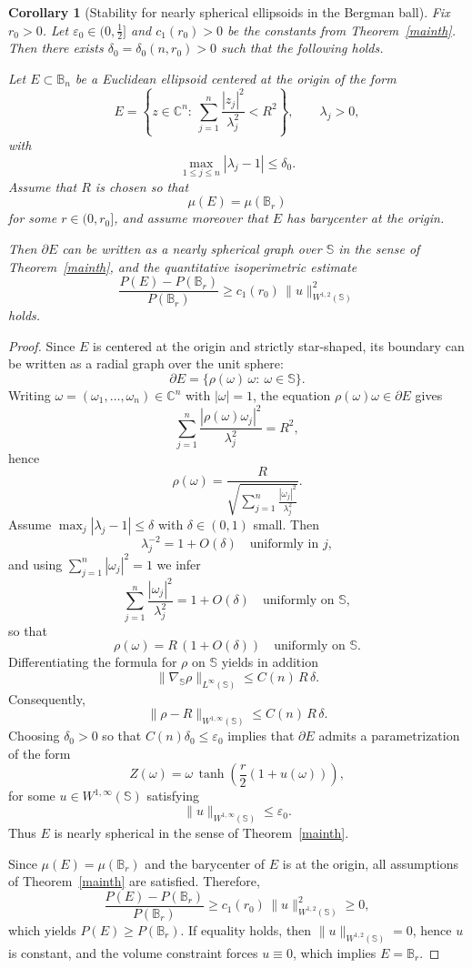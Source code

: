\documentclass[11pt]{amsart}
\newtheorem{corollary}[theorem]{Corollary}
\numberwithin{equation}{section}
\def\ge{\geqslant}
\begin{document}
\begin{corollary}[Stability for nearly spherical ellipsoids in the Bergman ball]\label{thm:ellipsoid_stability}
Fix $r_0>0$. Let $\varepsilon_0\in\bigl(0,\frac12\bigr]$ and $c_1(r_0)>0$ be the constants
from Theorem~\ref{mainth}. Then there exists $\delta_0=\delta_0(n,r_0)>0$ such that the
following holds.

Let $E\subset\mathbb B_n$ be a Euclidean ellipsoid centered at the origin of the form
\[
E=\left\{z\in\mathbb C^n:\ \sum_{j=1}^n \frac{|z_j|^2}{\lambda_j^2}<R^2\right\},
\qquad \lambda_j>0,
\]
with
\[
\max_{1\le j\le n}|\lambda_j-1|\le \delta_0.
\]
Assume that $R$ is chosen so that
\[
\mu(E)=\mu(\mathbb B_r)
\]
for some $r\in(0,r_0]$, and assume moreover that $E$ has barycenter at the origin.

Then $\partial E$ can be written as a nearly spherical graph over $\mathbb S$ in the sense
of Theorem~\ref{mainth}, and the quantitative isoperimetric estimate
\[
\frac{P(E)-P(\mathbb B_r)}{P(\mathbb B_r)}\ge c_1(r_0)\,\|u\|_{W^{1,2}(\mathbb S)}^2
\]
holds. 
\end{corollary}

\begin{proof}
Since $E$ is centered at the origin and strictly star-shaped, its boundary can be written
as a radial graph over the unit sphere:
\[
\partial E=\{\rho(\omega)\,\omega:\ \omega\in\mathbb S\}.
\]
Writing $\omega=(\omega_1,\dots,\omega_n)\in\mathbb C^n$ with $|\omega|=1$, the equation
$\rho(\omega)\omega\in\partial E$ gives
\[
\sum_{j=1}^n \frac{|\rho(\omega)\omega_j|^2}{\lambda_j^2}=R^2,
\]
hence
\[
\rho(\omega)=\frac{R}{\sqrt{\sum_{j=1}^n \frac{|\omega_j|^2}{\lambda_j^2}}}.
\]
Assume $\max_j|\lambda_j-1|\le \delta$ with $\delta\in(0,1)$ small. Then
\[
\lambda_j^{-2}=1+O(\delta)
\quad\text{uniformly in }j,
\]
and using $\sum_{j=1}^n|\omega_j|^2=1$ we infer
\[
\sum_{j=1}^n\frac{|\omega_j|^2}{\lambda_j^2}=1+O(\delta)
\quad\text{uniformly on }\mathbb S,
\]
so that
\[
\rho(\omega)=R\,(1+O(\delta))
\quad\text{uniformly on }\mathbb S.
\]
Differentiating the formula for $\rho$ on $\mathbb S$ yields in addition
\[
\|\nabla_{\mathbb S}\rho\|_{L^\infty(\mathbb S)}\le C(n)\,R\,\delta.
\]
Consequently,
\[
\|\rho-R\|_{W^{1,\infty}(\mathbb S)}\le C(n)\,R\,\delta.
\]
Choosing $\delta_0>0$ so that $C(n)\delta_0\le \varepsilon_0$ implies that $\partial E$
admits a parametrization of the form
\[
Z(\omega)=\omega\,\tanh\!\left(\frac r2(1+u(\omega))\right),
\]
for some $u\in W^{1,\infty}(\mathbb S)$ satisfying
\[
\|u\|_{W^{1,\infty}(\mathbb S)}\le \varepsilon_0.
\]
Thus $E$ is nearly spherical in the sense of Theorem~\ref{mainth}.

\medskip

Since $\mu(E)=\mu(\mathbb B_r)$ and the barycenter of $E$ is at the origin, all
assumptions of Theorem~\ref{mainth} are satisfied. Therefore,
\[
\frac{P(E)-P(\mathbb B_r)}{P(\mathbb B_r)}\ge c_1(r_0)\,\|u\|_{W^{1,2}(\mathbb S)}^2\ge 0,
\]
which yields $P(E)\ge P(\mathbb B_r)$.
If equality holds, then $\|u\|_{W^{1,2}(\mathbb S)}=0$, hence $u$ is constant, and the
volume constraint forces $u\equiv 0$, which implies $E=\mathbb B_r$.
\end{proof}
\end{document}
